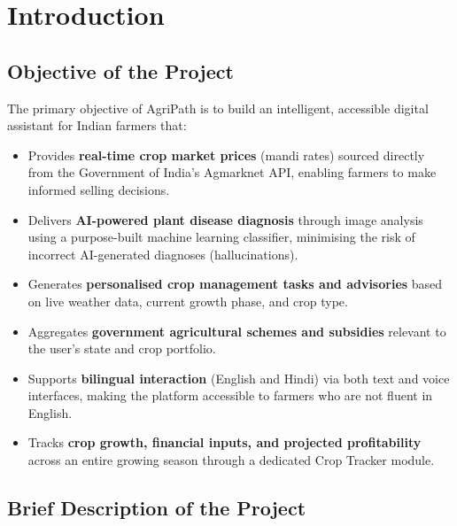 \documentclass[12pt,a4paper]{article}
\begin{document}
\newpage
\tableofcontents

\newpage
{}
\setcounter{page}{1}

\section{Introduction}

\subsection{Objective of the Project}

The primary objective of AgriPath is to build an intelligent, accessible digital assistant for Indian farmers that:

\begin{itemize}
    \item Provides \textbf{real-time crop market prices} (mandi rates) sourced directly from the Government of India's Agmarknet API, enabling farmers to make informed selling decisions.
    \item Delivers \textbf{AI-powered plant disease diagnosis} through image analysis using a purpose-built machine learning classifier, minimising the risk of incorrect AI-generated diagnoses (hallucinations).
    \item Generates \textbf{personalised crop management tasks and advisories} based on live weather data, current growth phase, and crop type.
    \item Aggregates \textbf{government agricultural schemes and subsidies} relevant to the user's state and crop portfolio.
    \item Supports \textbf{bilingual interaction} (English and Hindi) via both text and voice interfaces, making the platform accessible to farmers who are not fluent in English.
    \item Tracks \textbf{crop growth, financial inputs, and projected profitability} across an entire growing season through a dedicated Crop Tracker module.
\end{itemize}

\subsection{Brief Description of the Project}
\end{document}
